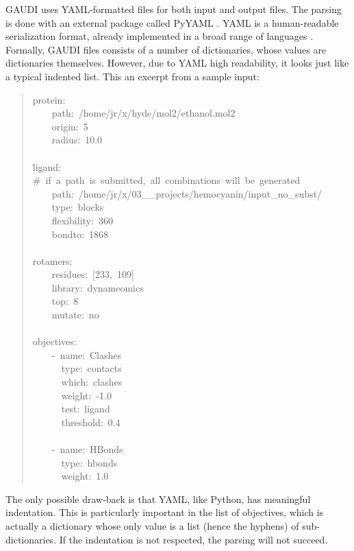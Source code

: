 GAUDI uses YAML-formatted files for both input and output files. The parsing is done with an external package called PyYAML . YAML is a human-readable serialization format, already implemented in a broad range of languages . Formally, GAUDI files consists of a number of dictionaries, whose values are dictionaries themselves. However, due to YAML high readability, it looks just like a typical indented list. This an excerpt from a sample input:
%
\begin{quote}{\ttfamily \raggedright \noindent
protein:\\
~~~~path:~/home/jr/x/hyde/mol2/ethanol.mol2\\
~~~~origin:~5\\
~~~~radius:~10.0\\
~\\
ligand:\\
\#~if~a~path~is~submitted,~all~combinations~will~be~generated\\
~~~~path:~/home/jr/x/03\_\_projects/hemocyanin/input\_no\_subst/\\
~~~~type:~blocks\\
~~~~flexibility:~360\\
~~~~bondto:~1868\\
~\\
rotamers:\\
~~~~residues:~{[}233,~109{]}\\
~~~~library:~dynameomics\\
~~~~top:~8\\
~~~~mutate:~no\\
~\\
objectives:\\
~~~~-~name:~Clashes\\
~~~~~~type:~contacts\\
~~~~~~which:~clashes\\
~~~~~~weight:~-1.0\\
~~~~~~test:~ligand\\
~~~~~~threshold:~0.4\\
~\\
~~~~-~name:~HBonds\\
~~~~~~type:~hbonds\\
~~~~~~weight:~1.0
}
\end{quote}

The only possible draw-back is that YAML, like Python, has meaningful indentation. This is particularly important in the list of objectives, which is actually a dictionary whose only value is a list (hence the hyphens) of sub-dictionaries. If the indentation is not respected, the parsing will not succeed.
